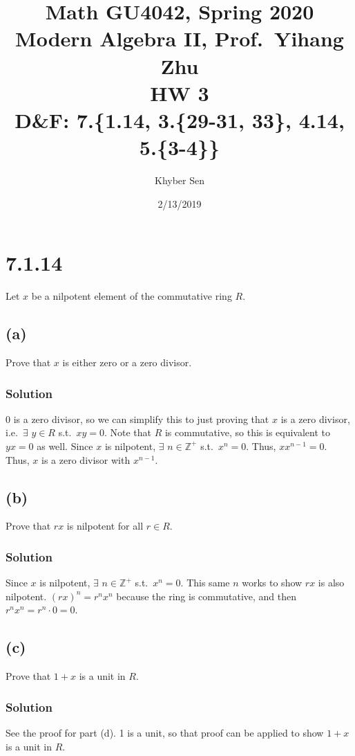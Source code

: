 \documentclass[fleqn]{article}
\title{
Math GU4042, Spring 2020 \\
Modern Algebra II, Prof.\ Yihang Zhu \\
HW 3 \\
D\&F: 7.\{1.14, 3.\{29-31, 33\}, 4.14, 5.\{3-4\}\}
}
\author{Khyber Sen}
\date{2/13/2019}
\begin{document}
    
    \maketitle
    
    \section{7.1.14}
    Let $x$ be a nilpotent element of the commutative ring $R$.
        
        \subsection{(a)}
        Prove that $x$ is either zero or a zero divisor.
            
            \subsubsection{Solution}
            0 is a zero divisor, so we can simplify this to just proving that $x$ is a zero divisor, i.e.\ $\exists$ $y \in R$ s.t.\ $xy = 0$.  Note that $R$ is commutative, so this is equivalent to $yx = 0$ as well.  Since $x$ is nilpotent, $\exists$ $n \in \mathbb{Z}^+$ s.t.\ $x^n = 0$.  Thus, $x x^{n - 1} = 0$.  Thus, $x$ is a zero divisor with $x^{n - 1}$.
        
        \subsection{(b)}
        Prove that $rx$ is nilpotent for all $r \in R$.
            
            \subsubsection{Solution}
            Since $x$ is nilpotent, $\exists$ $n \in \mathbb{Z}^+$ s.t.\ $x^n = 0$.  This same $n$ works to show $rx$ is also nilpotent.  $(rx)^n = r^n x^n$ because the ring is commutative, and then $r^n x^n = r^n \cdot 0 = 0$.
        
        \subsection{(c)}
        Prove that $1 + x$ is a unit in $R$.
            
            \subsubsection{Solution}
            See the proof for part (d).  1 is a unit, so that proof can be applied to show $1 + x$ is a unit in $R$.
        
\end{document}
